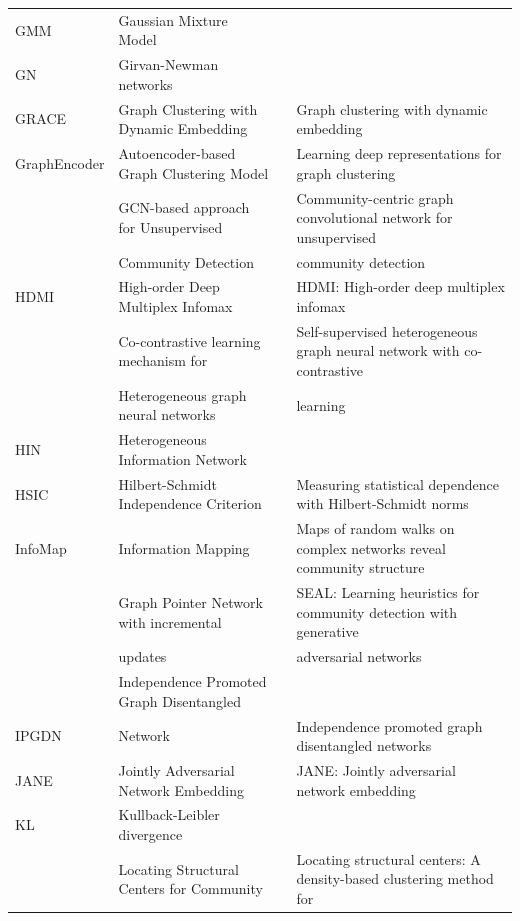 \begin{table}[!t]
\begin{tabular}{llll}
GMM & Gaussian Mixture Model  & &  \\
GN & Girvan-Newman networks &  &  \\
\rowcolor{gray!30}
GRACE & Graph Clustering with Dynamic Embedding &  & Graph clustering with dynamic embedding \\
GraphEncoder & Autoencoder-based Graph Clustering Model &  & Learning deep representations for graph clustering \\
\rowcolor{gray!30}
& GCN-based approach for Unsupervised &  & Community-centric graph convolutional network for unsupervised \\
\rowcolor{gray!30}
\multirow{-2}{*}{GUCD} & Community Detection & \multirow{-2}{*}{} &  community detection \\ \midrule
HDMI & High-order Deep Multiplex Infomax &  & HDMI: High-order deep multiplex infomax \\
\rowcolor{gray!30}
& Co-contrastive learning mechanism for & & Self-supervised heterogeneous graph neural network with co-contrastive \\
\rowcolor{gray!30}
\multirow{-2}{*}{HeCo} & Heterogeneous graph neural networks & \multirow{-2}{*}{} &  learning \\
HIN & Heterogeneous Information Network  & & \\
\rowcolor{gray!30}
HSIC & Hilbert-Schmidt Independence Criterion &  & Measuring statistical dependence with Hilbert-Schmidt norms \\ \midrule
InfoMap & Information Mapping &  & Maps of random walks on complex networks reveal community structure \\
\rowcolor{gray!30}
& Graph Pointer Network with incremental &  & SEAL: Learning heuristics for community detection with generative \\
\rowcolor{gray!30}
\multirow{-2}{*}{iGPN} & updates & \multirow{-2}{*}{} & adversarial networks \\
& Independence Promoted Graph Disentangled &  &  \\ 
\multirow{-2}{*}{IPGDN} & Network & \multirow{-2}{*}{} & \multirow{-2}{*}{Independence promoted graph disentangled networks} \\ \midrule
\rowcolor{gray!30}
JANE & Jointly Adversarial Network Embedding &  & JANE: Jointly adversarial network embedding \\ \midrule
KL & Kullback-Leibler divergence & &  \\ \midrule
\rowcolor{gray!30}
& Locating Structural Centers for Community &  & Locating structural centers: A density-based clustering method for \\

\end{tabular}
\end{table}
